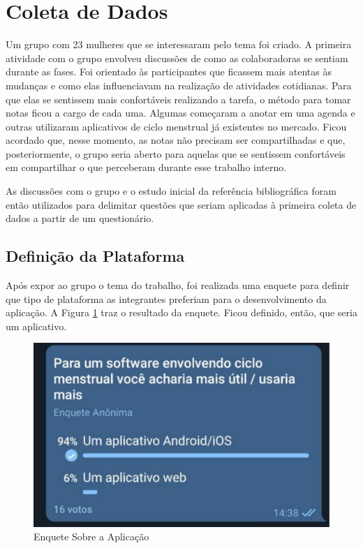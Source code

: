 \section{Coleta de Dados}

Um grupo com 23 mulheres que se interessaram pelo tema foi criado. A primeira 
atividade com o grupo envolveu discussões de como as colaboradoras se sentiam durante as fases. Foi orientado
às participantes que ficassem mais atentas às mudanças e como elas influenciavam na realização de 
atividades cotidianas. Para que elas se sentissem mais confortáveis realizando a tarefa, o método para tomar notas ficou a cargo de cada uma. 
Algumas começaram a anotar em uma agenda e outras utilizaram 
aplicativos de ciclo menstrual já existentes no mercado. Ficou acordado que, 
nesse momento, as notas não precisam ser compartilhadas e que, posteriormente, o grupo seria aberto para 
aquelas que se sentissem confortáveis em compartilhar o que perceberam 
durante esse trabalho interno.

As discussões com o grupo e o estudo inicial da referência bibliográfica foram então utilizados para 
delimitar questões que seriam aplicadas à primeira coleta de dados a partir de um questionário.

\subsection{Definição da Plataforma}

Após expor ao grupo o tema do trabalho, foi realizada uma enquete para definir que tipo de plataforma as 
integrantes preferiam para o desenvolvimento da aplicação. A Figura \ref{fig07} traz o resultado da enquete. Ficou definido, então, que seria 
um aplicativo.

\begin{figure}[h]
	\centering
	\includegraphics[keepaspectratio=true,scale=0.3]{figuras/enqueteApp.pdf}
	\caption{Enquete Sobre a Aplicação}
        \label{fig07}
\end{figure}

